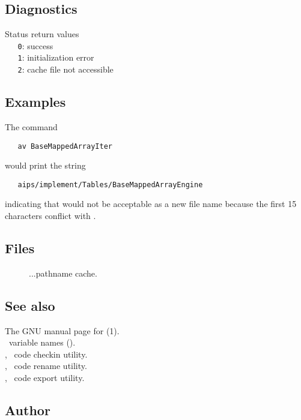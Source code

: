 \subsection*{Diagnostics}

Status return values
\\ \verb+   0+: success
\\ \verb+   1+: initialization error
\\ \verb+   2+: cache file not accessible

\subsection*{Examples}

The command

\begin{verbatim}
   av BaseMappedArrayIter
\end{verbatim}

\noindent
would print the string

\begin{verbatim}
   aips/implement/Tables/BaseMappedArrayEngine
\end{verbatim}

\noindent
indicating that  would not be acceptable as a new
file name because the first 15 characters conflict with
.

\subsection*{Files}

\begin{description}
\item[]
...pathname cache.
\end{description}

\subsection*{See also}

The GNU manual page for (1).\\
\aipspp\ variable names ().\\
, \aipspp\ code checkin utility.\\
, \aipspp\ code rename utility.\\
, \aipspp\ code export utility.

\subsection*{Author}

